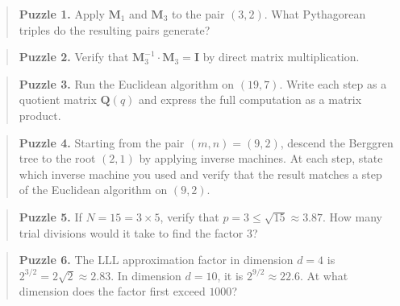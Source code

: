 \begin{quote}
\textbf{Puzzle 1.} Apply \(\mathbf{M}_1\) and \(\mathbf{M}_3\) to the pair \((3, 2)\). What Pythagorean triples do the resulting pairs generate?
\end{quote}

\begin{quote}
\textbf{Puzzle 2.} Verify that \(\mathbf{M}_3^{-1} \cdot \mathbf{M}_3 = \mathbf{I}\) by direct matrix multiplication.
\end{quote}

\begin{quote}
\textbf{Puzzle 3.} Run the Euclidean algorithm on \((19, 7)\). Write each step as a quotient matrix \(\mathbf{Q}(q)\) and express the full computation as a matrix product.
\end{quote}

\begin{quote}
\textbf{Puzzle 4.} Starting from the pair \((m, n) = (9, 2)\), descend the Berggren tree to the root \((2, 1)\) by applying inverse machines. At each step, state which inverse machine you used and verify that the result matches a step of the Euclidean algorithm on \((9, 2)\).
\end{quote}

\begin{quote}
\textbf{Puzzle 5.} If \(N = 15 = 3 \times 5\), verify that \(p = 3 \le \sqrt{15} \approx 3.87\). How many trial divisions would it take to find the factor \(3\)?
\end{quote}

\begin{quote}
\textbf{Puzzle 6.} The LLL approximation factor in dimension \(d = 4\) is \(2^{3/2} = 2\sqrt{2} \approx 2.83\). In dimension \(d = 10\), it is \(2^{9/2} \approx 22.6\). At what dimension does the factor first exceed \(1000\)?
\end{quote}
